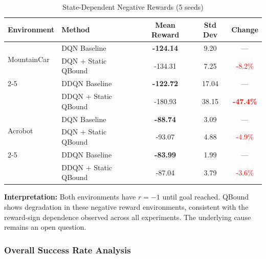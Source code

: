 \documentclass[11pt]{article}
\theoremstyle{definition}
\theoremstyle{remark}
\begin{document}
\begin{table}[h]
\centering
\caption{State-Dependent Negative Rewards (5 seeds)}
\label{tab:state-dependent}
\begin{tabular}{llccc}
\toprule
Environment & Method & Mean Reward & Std Dev & Change \\
\midrule
\multirow{2}{*}{MountainCar} & DQN Baseline & \textbf{-124.14} & 9.20 & --- \\
& DQN + Static QBound & -134.31 & 7.25 & \textcolor{red}{-8.2\%} \\
\cmidrule{2-5}
& DDQN Baseline & \textbf{-122.72} & 17.04 & --- \\
& DDQN + Static QBound & -180.93 & 38.15 & \textcolor{red}{\textbf{-47.4\%}} \\
\midrule
\multirow{2}{*}{Acrobot} & DQN Baseline & \textbf{-88.74} & 3.09 & --- \\
& DQN + Static QBound & -93.07 & 4.88 & \textcolor{red}{-4.9\%} \\
\cmidrule{2-5}
& DDQN Baseline & \textbf{-83.99} & 1.99 & --- \\
& DDQN + Static QBound & -87.04 & 3.79 & \textcolor{red}{-3.6\%} \\
\bottomrule
\end{tabular}
\end{table}

\textbf{Interpretation:} Both environments have $r = -1$ until goal reached. QBound shows degradation in these negative reward environments, consistent with the reward-sign dependence observed across all experiments. The underlying cause remains an open question.

\subsubsection{Overall Success Rate Analysis}
\end{document}
